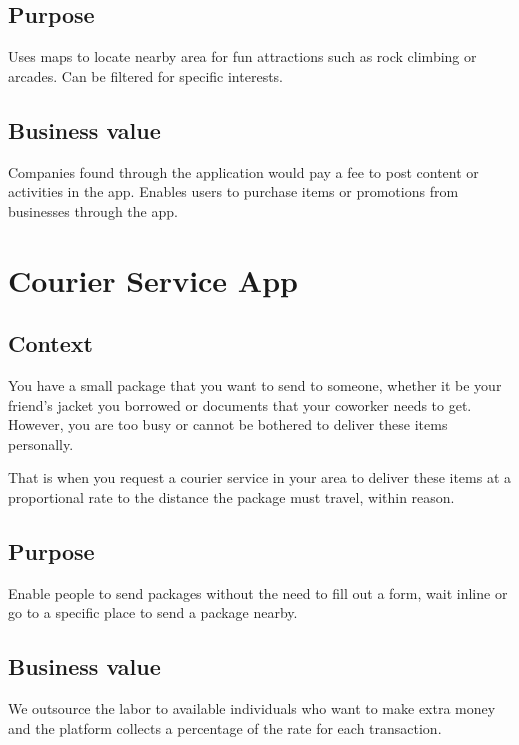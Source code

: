\documentclass[12pt]{article}
\begin{document}
\subsection{Purpose}
Uses maps to locate nearby area for fun attractions such as rock climbing 
or arcades. Can be filtered for specific interests.

\subsection{Business value}
Companies found through the application would pay a fee to post content or 
activities in the app. Enables users to purchase items or promotions from 
businesses through the app.

\pagebreak

\section{Courier Service App}
\subsection{Context}
You have a small package that you want to send to someone, whether it be your 
friend’s jacket you borrowed or documents that your coworker needs to get. 
However, you are too busy or cannot be bothered to deliver these items 
personally. \newline

That is when you request a courier service in your area to deliver 
these items at a proportional rate to the distance the package must travel, 
within reason. 

\subsection{Purpose}
Enable people to send packages without the need to fill out a form, wait 
inline or go to a specific place to send a package nearby.

\subsection{Business value}
We outsource the labor to available individuals who want to make extra 
money and the platform collects a percentage of the rate for each transaction. 
\end{document}
